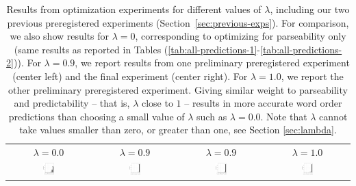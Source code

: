 \documentclass[10pt,twoside,lineno]{article}
\begin{document}
\begin{table}[hbt!]
	\begin{center}
\begin{tabular}{cccc}
$\lambda=0.0$ & $\lambda=0.9$ & $\lambda=0.9$ & $\lambda=1.0$ \\
	\includegraphics[width=0.15\textwidth]{../results/correlations/figures/posterior-satisfied-universals-parseability.pdf}&
	\includegraphics[width=0.15\textwidth]{../results/correlations/figures/posterior-satisfied-universals-together-large-prior-efficiency09.pdf}&
	\includegraphics[width=0.15\textwidth]{../results/correlations/figures/posterior-satisfied-universals-efficiency-large.pdf}&
	\includegraphics[width=0.15\textwidth]{../results/correlations/figures/posterior-satisfied-universals-together-large-prior-efficiency10.pdf}
\end{tabular}
	\end{center}
	\caption{Results from optimization experiments for different values of $\lambda$, including our two previous preregistered experiments (Section~\ref{sec:previous-exps}). For comparison, we also show results for $\lambda=0$, corresponding to optimizing for parseability only (same results as reported in Tables (\ref{tab:all-predictions-1}-\ref{tab:all-predictions-2})). For $\lambda=0.9$, we report results from one preliminary preregistered experiment (center left) and the final experiment (center right). For $\lambda=1.0$, we report the other preliminary preregistered experiment.
Giving similar weight to parseability and predictability -- that is, $\lambda$ close to $1$ -- results in more accurate word order predictions than choosing a small value of $\lambda$ such as $\lambda=0.0$. Note that $\lambda$ cannot take values smaller than zero, or greater than one, see Section \ref{sec:lambda}.
}\label{table:corr-resu-previous}
\end{table}
\end{document}
